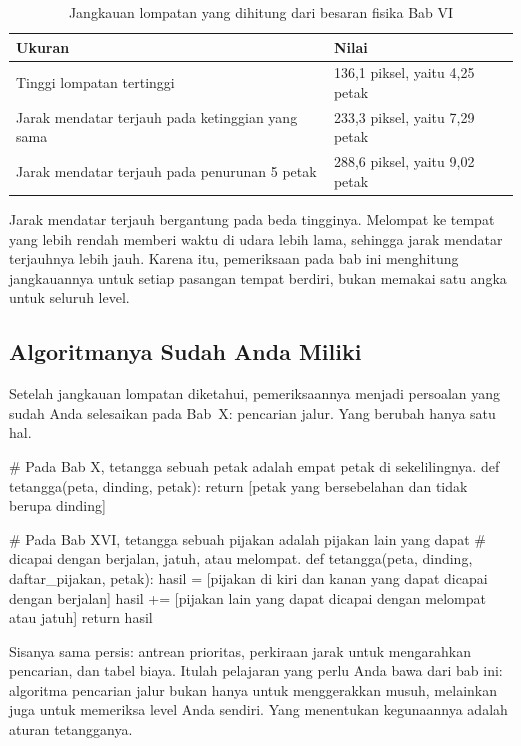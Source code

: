 \begin{table}[htbp]
\centering
\caption{Jangkauan lompatan yang dihitung dari besaran fisika Bab VI}
\label{tab:jangkauan-lompatan}
{\setlength{\tabcolsep}{4pt}\footnotesize%
\begin{tabularx}{\textwidth}{@{}L{7.0cm} Y@{}}
\toprule
\headrow \textbf{Ukuran} & \textbf{Nilai} \\
\midrule
Tinggi lompatan tertinggi & 136,1 piksel, yaitu 4,25 petak \\
\addlinespace
Jarak mendatar terjauh pada ketinggian yang sama & 233,3 piksel, yaitu 7,29 petak \\
\addlinespace
Jarak mendatar terjauh pada penurunan 5 petak & 288,6 piksel, yaitu 9,02 petak \\
\bottomrule
\end{tabularx}}
\end{table}

Jarak mendatar terjauh bergantung pada beda tingginya.
Melompat ke tempat yang lebih rendah memberi waktu di udara lebih lama,
sehingga jarak mendatar terjauhnya lebih jauh. Karena itu, pemeriksaan pada
bab ini menghitung jangkauannya untuk setiap pasangan tempat berdiri, bukan
memakai satu angka untuk seluruh level.

\subsection{Algoritmanya Sudah Anda Miliki}

Setelah jangkauan lompatan diketahui, pemeriksaannya menjadi persoalan yang
sudah Anda selesaikan pada Bab~X: pencarian jalur. Yang berubah hanya satu
hal.

\begin{kodekeluaran}
# Pada Bab X, tetangga sebuah petak adalah empat petak di sekelilingnya.
def tetangga(peta, dinding, petak):
    return [petak yang bersebelahan dan tidak berupa dinding]

# Pada Bab XVI, tetangga sebuah pijakan adalah pijakan lain yang dapat
# dicapai dengan berjalan, jatuh, atau melompat.
def tetangga(peta, dinding, daftar_pijakan, petak):
    hasil = [pijakan di kiri dan kanan yang dapat dicapai dengan berjalan]
    hasil += [pijakan lain yang dapat dicapai dengan melompat atau jatuh]
    return hasil
\end{kodekeluaran}

Sisanya sama persis: antrean prioritas, perkiraan jarak untuk mengarahkan
pencarian, dan tabel biaya. Itulah pelajaran yang perlu Anda bawa dari bab
ini: algoritma pencarian jalur bukan hanya untuk menggerakkan musuh, melainkan
juga untuk memeriksa level Anda sendiri. Yang menentukan kegunaannya adalah
aturan tetangganya.

